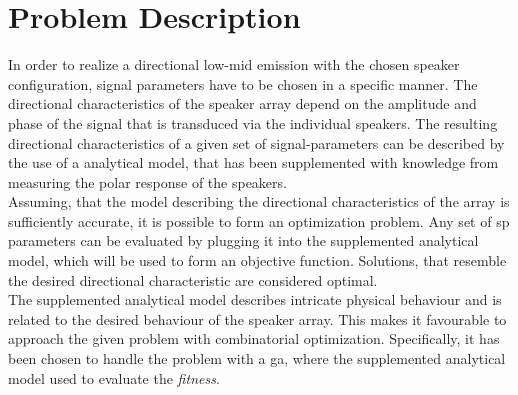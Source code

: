 \section{Problem Description}
In order to realize a directional low-mid emission with the chosen speaker configuration, signal parameters have to be chosen in a specific manner. The directional characteristics of the speaker array depend on the amplitude and phase of the signal that is transduced via the individual speakers. The resulting directional characteristics of a given set of signal-parameters can be described by the use of a analytical model, that has been supplemented with knowledge from measuring the polar response of the speakers.\\
Assuming, that the model describing the directional characteristics of the array is sufficiently accurate, it is possible to form an optimization problem. Any set of \gls{sp} parameters can be evaluated by plugging it into the supplemented analytical model, which will be used to form an objective function. Solutions, that resemble the desired directional characteristic are considered optimal.\\
The supplemented analytical model describes intricate physical behaviour and is related to the desired behaviour of the speaker array.  This makes it favourable to approach the given problem with combinatorial optimization. Specifically, it has been chosen to handle the problem with a \gls{ga}, where the supplemented analytical model used to evaluate the \textit{fitness}.


